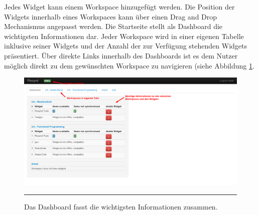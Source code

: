Jedes Widget kann einem Workspace hinzugefügt werden. Die Position der Widgets innerhalb eines Workspaces kann über einen Drag and Drop Mechanismus angepasst werden. Die Startseite stellt als Dashboard die wichtigsten Informationen dar. Jeder Workspace wird in einer eigenen Tabelle inklusive seiner Widgets und der Anzahl der zur Verfügung stehenden Widgets präsentiert. Über direkte Links innerhalb des Dashboards ist es dem Nutzer möglich direkt zu dem gewünschten Workspace zu navigieren (siehe Abbildung \ref{fig:plesynd_dashboard}.
\begin{figure}
  \centering
  \includegraphics[width=\textwidth,height=\textheight,keepaspectratio]{./Figures/plesynd_dashboard.png}
    \rule{35em}{0.5pt}
  \caption[Plesynd User-Interface: Dashboard]{Das Dashboard fasst die wichtigsten Informationen zusammen.}
  \label{fig:plesynd_dashboard}
\end{figure}